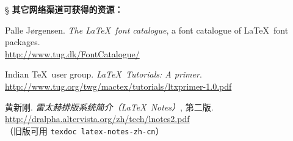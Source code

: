 \begin{thebibliography}{20}
\item[\S] {\bfseries 其它网络渠道可获得的资源：}

 Palle J{\o}rgensen.
  \newblock \emph{The \LaTeX\ font catalogue}, a font catalogue of \LaTeX\ font packages.\\
  \url{http://www.tug.dk/FontCatalogue/}

 Indian \TeX\ user group.
  \newblock \emph{\LaTeX\ Tutorials: A primer}. \\
  \url{http://www.tug.org/twg/mactex/tutorials/ltxprimer-1.0.pdf}

 黄新刚.
  \newblock \emph{雷太赫排版系统简介（\LaTeX\ Notes）}, 第二版. \\
  \url{http://dralpha.altervista.org/zh/tech/lnotes2.pdf} \\
  （旧版可用 \texttt{texdoc latex-notes-zh-cn}）

\end{thebibliography}

\endinput